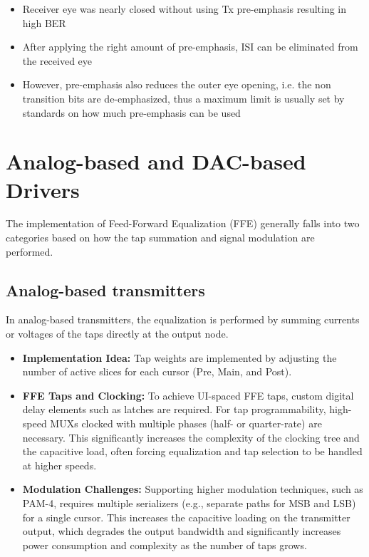 \documentclass[12pt, a4paper]{report}
\begin{document}
\begin{itemize}
\item Receiver eye was nearly closed without using Tx pre-emphasis resulting in high BER
\item After applying the right amount of pre-emphasis, ISI can be eliminated from the received eye
\item However, pre-emphasis also reduces the outer eye opening, i.e. the non 
transition bits are de-emphasized, thus a maximum limit is usually set by 
standards on how much pre-emphasis can be used

\end{itemize}

\section{Analog-based and DAC-based Drivers} \label{sec:Analog/DAC-based}

The implementation of Feed-Forward Equalization (FFE) generally falls into two categories based on how the tap summation and signal modulation are performed.

\subsection{Analog-based transmitters} \label{subsec:Analog-based}
In analog-based transmitters, the equalization is performed by summing currents or voltages of the taps directly at the output node.

\begin{itemize}
    \item \textbf{Implementation Idea:} Tap weights are implemented by adjusting the number of active slices for each cursor (Pre, Main, and Post).
    \item \textbf{FFE Taps and Clocking:} To achieve UI-spaced FFE taps, custom digital delay elements such as latches are required. For tap programmability, high-speed MUXs clocked with multiple phases (half- or quarter-rate) are necessary. This significantly increases the complexity of the clocking tree and the capacitive load, often forcing equalization and tap selection to be handled at higher speeds.
    \item \textbf{Modulation Challenges:} Supporting higher modulation techniques, such as PAM-4, requires multiple serializers (e.g., separate paths for MSB and LSB) for a single cursor. This increases the capacitive loading on the transmitter output, which degrades the output bandwidth and significantly increases power consumption and complexity as the number of taps grows.
\end{itemize}
\end{document}
